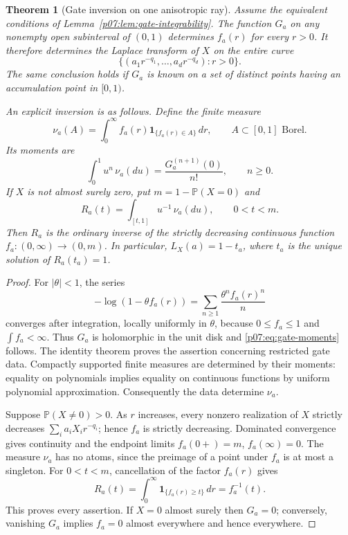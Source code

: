 \documentclass[11pt,letterpaper]{article}
\newtheorem{theorem}{Theorem}[section]
\theoremstyle{definition}
\theoremstyle{remark}
\newcommand{\Pp}{\mathbb P}
\newcommand{\1}{\mathbf 1}
\begin{document}
\begin{theorem}[Gate inversion on one anisotropic ray]
\label{p07:thm:gate-inversion}
Assume the equivalent conditions of Lemma~\ref{p07:lem:gate-integrability}.
The function $G_a$ on any nonempty open subinterval of $(0,1)$ determines
$f_a(r)$ for every $r>0$. It therefore determines the Laplace transform of
$X$ on the entire curve
\[
 \{(a_1r^{-q_1},\ldots,a_dr^{-q_d}):r>0\}.
\]
The same conclusion holds if $G_a$ is known on a set of distinct points
having an accumulation point in $[0,1)$.

An explicit inversion is as follows. Define the finite measure
\begin{equation}\label{p07:eq:gate-measure}
 \nu_a(A)=\int_0^\infty f_a(r)
                  \mathbf1_{\{f_a(r)\in A\}}\,dr,
 \qquad A\subset[0,1]\text{ Borel}.
\end{equation}
Its moments are
\begin{equation}\label{p07:eq:gate-moments}
 \int_0^1 u^n\,\nu_a(du)=\frac{G_a^{(n+1)}(0)}{n!},
 \qquad n\geq0.
\end{equation}
If $X$ is not almost surely zero, put $m=1-\Pp(X=0)$ and
\begin{equation}\label{p07:eq:gate-tail}
 R_a(t)=\int_{[t,1]}u^{-1}\,\nu_a(du),\qquad 0<t<m.
\end{equation}
Then $R_a$ is the ordinary inverse of the strictly decreasing continuous
function $f_a:(0,\infty)\to(0,m)$. In particular, $L_X(a)=1-t_a$,
where $t_a$ is the unique solution of $R_a(t_a)=1$.
\end{theorem}
\begin{proof}
For $|\theta|<1$, the series
\[
 -\log(1-\theta f_a(r))
 =\sum_{n\geq1}\frac{\theta^n f_a(r)^n}{n}
\]
converges after integration, locally uniformly in $\theta$, because
$0\leq f_a\leq1$ and $\int f_a<\infty$. Thus $G_a$ is holomorphic
in the unit disk and \eqref{p07:eq:gate-moments} follows. The identity theorem
proves the assertion concerning restricted gate data. Compactly supported
finite measures are determined by their moments: equality on polynomials
implies equality on continuous functions by uniform polynomial
approximation. Consequently the data determine $\nu_a$.

Suppose $\Pp(X\ne0)>0$. As $r$ increases, every nonzero realization of
$X$ strictly decreases $\sum_i a_iX_i r^{-q_i}$; hence $f_a$ is strictly
decreasing. Dominated convergence gives continuity and the endpoint limits
$f_a(0+)=m$, $f_a(\infty)=0$. The measure $\nu_a$ has no atoms,
since the preimage of a point under $f_a$ is at most a singleton. For
$0<t<m$, cancellation of the factor $f_a(r)$ gives
\[
 R_a(t)=\int_0^\infty\mathbf1_{\{f_a(r)\geq t\}}\,dr
       =f_a^{-1}(t).
\]
This proves every assertion. If $X=0$ almost surely then $G_a=0$; conversely,
vanishing $G_a$ implies $f_a=0$ almost everywhere and hence everywhere.
\end{proof}
\end{document}
